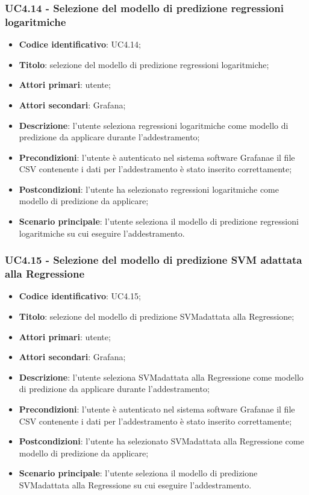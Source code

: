 \subsubsection{UC4.14 - Selezione del modello di predizione regressioni logaritmiche}
\begin{itemize}
	\item \textbf{Codice identificativo}: UC4.14;
	\item \textbf{Titolo}: selezione del modello di predizione regressioni logaritmiche;
	\item \textbf{Attori primari}: utente;
	\item \textbf{Attori secondari}: Grafana\glo;
	\item \textbf{Descrizione}: l'utente seleziona regressioni logaritmiche come modello di predizione da applicare durante l'addestramento;
	\item \textbf{Precondizioni}: l'utente è autenticato nel sistema software Grafana\glosp e il file CSV contenente i dati per l'addestramento è stato inserito correttamente;
	\item \textbf{Postcondizioni}: l'utente ha selezionato regressioni logaritmiche come modello di predizione da applicare;
	\item \textbf{Scenario principale}: l'utente seleziona il modello di predizione regressioni logaritmiche su cui eseguire l'addestramento.
\end{itemize}
\subsubsection{UC4.15 - Selezione del modello di predizione SVM adattata alla Regressione}
\begin{itemize}
	\item \textbf{Codice identificativo}: UC4.15;
	\item \textbf{Titolo}: selezione del modello di predizione SVM\glosp adattata alla Regressione;
	\item \textbf{Attori primari}: utente;
	\item \textbf{Attori secondari}: Grafana\glo;
	\item \textbf{Descrizione}: l'utente seleziona SVM\glosp adattata alla Regressione come modello di predizione da applicare durante l'addestramento;
	\item \textbf{Precondizioni}: l'utente è autenticato nel sistema software Grafana\glosp e il file CSV contenente i dati per l'addestramento è stato inserito correttamente;
	\item \textbf{Postcondizioni}: l'utente ha selezionato SVM\glosp adattata alla Regressione come modello di predizione da applicare;
	\item \textbf{Scenario principale}: l'utente seleziona il modello di predizione SVM\glosp adattata alla Regressione su cui eseguire l'addestramento.
\end{itemize}
